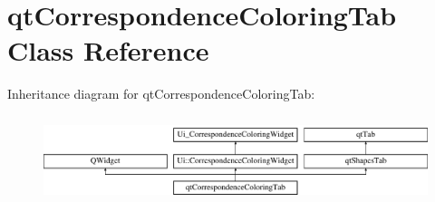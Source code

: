 \hypertarget{classqt_correspondence_coloring_tab}{}\section{qt\+Correspondence\+Coloring\+Tab Class Reference}
\label{classqt_correspondence_coloring_tab}
Inheritance diagram for qt\+Correspondence\+Coloring\+Tab\+:\begin{figure}[H]
\begin{center}
\leavevmode
\includegraphics[height=2.557078cm]{classqt_correspondence_coloring_tab}
\end{center}
\end{figure}
